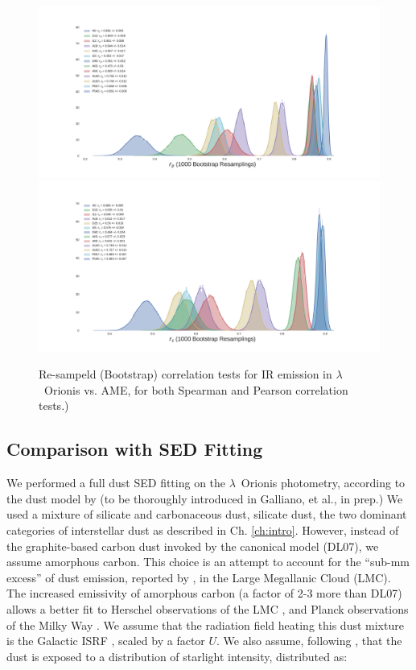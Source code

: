             \begin{figure}
              \includegraphics[width=\textwidth]{../Plots/ch_lori/bootstrap_vs_AME_pearson_i1000.pdf}
              \includegraphics[width=\textwidth]{../Plots/ch_lori/bootstrap_vs_AME_spearman_i1000.pdf}
              \centering
              \caption{Re-sampeld (Bootstrap) correlation tests for IR emission in $\lambda$~Orionis vs. AME, for both Spearman and Pearson correlation tests.)
              }
              \label{fig:bootstrap_vs_AME}
            \end{figure}


        \subsection{Comparison with SED Fitting}
          We performed a full dust SED fitting on the $\lambda$~Orionis photometry, according to the dust model by \cite{galliano11} (to be thoroughly introduced in Galliano, et al., in prep.)  We used a mixture of silicate and carbonaceous dust, silicate dust, the two dominant categories of interstellar dust as described in Ch. \ref{ch:intro}. However, instead of the graphite-based carbon dust invoked by the canonical \cite{draine07} model (DL07), we assume amorphous carbon. This choice is an attempt to account for the ``sub-mm excess'' of dust emission, reported by \cite{israel10, bot10}, in the Large Megallanic Cloud (LMC). The increased emissivity of amorphous carbon (a factor of 2-3 more than DL07) allows a better fit to Herschel observations of the LMC \citep{galliano11}, and Planck observations of the Milky Way \citep{planckIntXXIX16}. We assume that the radiation field heating this dust mixture is the Galactic ISRF \citep{mathis83}, scaled by a factor $U$. We also assume, following \cite{dale01}, that the dust is exposed to a distribution of starlight intensity, distributed as:

